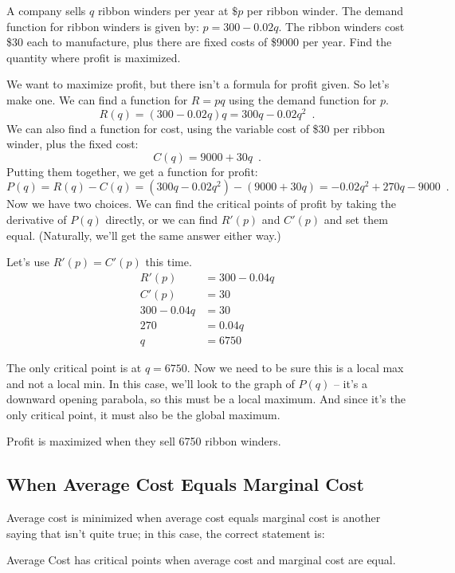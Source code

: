 \begin{example}
A company sells $q$ ribbon winders per year at $\$p$ per ribbon winder. The demand function for ribbon winders is given by: $p=300-0.02q$. The ribbon winders cost \$30 each to manufacture, plus there are fixed costs of \$9000 per year. Find the quantity where profit is maximized.

\begin{solution} We want to maximize profit, but there isn't a formula for profit given. So let's make one. We can find a function for $R = pq$ using the demand function for $p$.
$$R(q)=(300-0.02q)q=300q-0.02q^2 \enspace .$$
We can also find a function for cost, using the variable cost of \$30 per ribbon winder, plus the fixed cost:
$$C(q)=9000+30q \enspace .$$
Putting them together, we get a function for profit:
$$P(q)=R(q)-C(q)=(300q-0.02q^2)-(9000+30q)=-0.02q^2+270q-9000 \enspace .$$
Now we have two choices. We can find the critical points of profit by taking the derivative of $P(q)$ directly, or we can find $R'(p)$ and $C'(p)$ and set them equal. (Naturally, we'll get the same answer either way.)

Let's use $R'(p)=C'(p)$ this time.
\begin{align*}
  R'(p) &= 300-0.04q \\
  C'(p) &= 30 \\
  300-0.04q &= 30 \\
  270 &= 0.04q \\
  q &= 6750
\end{align*}

The only critical point is at $q=6750$. Now we need to be sure this is a local max and not a local min. In this case, we'll look to the graph of $P(q)$ -- it's a downward opening parabola, so this must be a local maximum. And since it's the only critical point, it must also be the global maximum.

Profit is maximized when they sell 6750 ribbon winders.
\end{solution}\end{example}

\subsection{When Average Cost Equals Marginal Cost}
Average cost is minimized when average cost equals marginal cost is another saying that isn't quite true; in this case, the correct statement is:
\begin{theorem}
Average Cost has critical points when average cost and marginal cost are equal.
\end{theorem}

